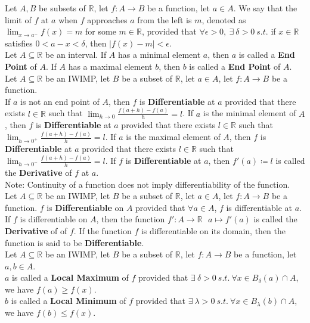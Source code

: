 \documentclass[11pt]{article}
\newcommand{\R}{\mathbb{R}}
\newcommand{\note}{\color{gray}Note: \color{black}}
\begin{document}
		\noindent Let $A,B$ be subsets of $\R$, let $f:A \to B$ be a function, let $a \in A$. We say that the limit of $f$ at $a$ when $f$ approaches $a$ from the left is $m$, denoted as $\lim_{x \to a^-} f(x)= m $ for some $m \in \R$, provided that $\forall \epsilon >0, \ \exists \ \delta >0 \ s.t.$ if $x \in \R$ satisfies $0<a-x<\delta$, then $|f(x) - m |<\epsilon$.\\
		
		\noindent Let $A\subseteq \R$ be an interval. If $A$ has a minimal element $a$, then $a$ is called a \textbf{End Point} of $A$. If $A$ has a maximal element $b$, then $b$ is called a \textbf{End Point} of $A$.\\	
		
		\noindent Let $A\subseteq \R$ be an IWIMP, let $B$ be a subset of $\R$, let $a \in A$, let $f:A \to B$ be a function. \\ If $a$ is not an end point of $A$, then $f$ is \textbf{Differentiable} at $a$ provided that there exists $l \in \R$ such that $\lim_{h \to 0}\frac{f(a+h)-f(a)}{h} =l$. If $a$ is the minimal element of $A$, then $f$ is \textbf{Differentiable} at $a$ provided that there exists $l \in \R$ such that $\lim_{h \to 0^+}\frac{f(a+h)-f(a)}{h} =l$. If $a$ is the maximal element of $A$, then $f$ is \textbf{Differentiable} at $a$ provided that there exists $l \in \R$ such that $\lim_{h \to 0^-}\frac{f(a+h)-f(a)}{h} =l$. If $f$ is \textbf{Differentiable} at $a$, then $f'(a) \coloneqq l$ is called the \textbf{Derivative} of $f$ at $a$.\\
		\note Continuity of a function does not imply differentiability of the function.\\
		
		\noindent Let $A \subseteq \R$ be an IWIMP, let $B$ be a subset of $\R$, let $a \in A$, let $f:A \to B$ be a function. $f$ is \textbf{Differentiable} on $A$ provided that $\forall a \in A$, $f$ is differentiable at $a$. If $f$ is differentiable on $A$, then the function $f':A \to \R \ \ \ a \mapsto f'(a)$ is called the \textbf{Derivative} of of $f$. If the function $f$ is differentiable on its domain, then the function is said to be \textbf{Differentiable}.\\
		
		\noindent Let $A \subseteq \R$ be an IWIMP, let $B$ be a subset of $\R$, let $f:A \to B$ be a function, let $a,b \in A$. \\$a$ is called a \textbf{Local Maximum} of $f$ provided that $\exists \ \delta>0 \ s.t. \ \forall x \in B_{\delta}(a) \cap A$, we have $f(a)\geq f(x)$.\\ $b$ is called a \textbf{Local Minimum} of $f$ provided that $\exists \ \lambda>0 \ s.t. \ \forall x \in B_{\lambda}(b) \cap A$, we have $f(b)\leq f(x)$.\\
		
\end{document}
